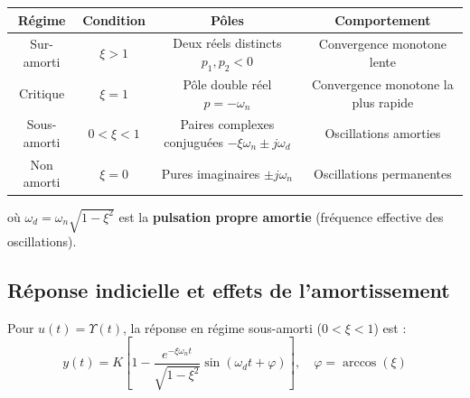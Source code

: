 \documentclass[11pt,a4paper]{report}
\begin{document}
\renewcommand{\arraystretch}{1.5}
\begin{center}
\small
\begin{tabular}{|c|c|c|c|}
\hline
\textbf{Régime} & \textbf{Condition} & \textbf{Pôles} & \textbf{Comportement} \\ \hline
Sur-amorti & $\xi > 1$ & Deux réels distincts $p_1, p_2 < 0$ & Convergence monotone lente \\ \hline
Critique & $\xi = 1$ & Pôle double réel $p = -\omega_n$ & Convergence monotone la plus rapide \\ \hline
Sous-amorti & $0 < \xi < 1$ & Paires complexes conjuguées $-\xi\omega_n \pm j\omega_d$ & Oscillations amorties \\ \hline
Non amorti & $\xi = 0$ & Pures imaginaires $\pm j\omega_n$ & Oscillations permanentes \\ \hline
\end{tabular}
\end{center}
\renewcommand{\arraystretch}{1}

où $\omega_d = \omega_n\sqrt{1-\xi^2}$ est la \textbf{pulsation propre amortie} (fréquence effective des oscillations).

\subsection{Réponse indicielle et effets de l'amortissement}

Pour $u(t) = \Upsilon(t)$, la réponse en régime sous-amorti ($0 < \xi < 1$) est :
\[
  y(t) = K\left[1 - \frac{e^{-\xi\omega_n t}}{\sqrt{1-\xi^2}}\sin\!\left(\omega_d t + \varphi\right)\right], \quad \varphi = \arccos(\xi)
\]
\end{document}
